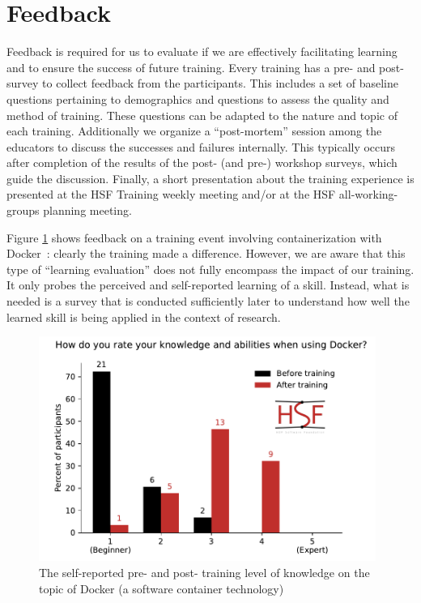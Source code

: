 \documentclass[twocolumn]{svjour3}          %
\begin{document}
\section{Feedback}\label{sec:Feedback}
%
Feedback is required for us to evaluate if we are effectively facilitating learning and to ensure the success of future training. Every training has a pre- and post- survey to collect feedback from the participants. This includes a set of baseline questions pertaining to demographics and questions to assess the quality and method of training. These questions can be adapted to the nature and topic of each training. Additionally we organize a \enquote{post-mortem} session among the educators to discuss the successes and failures internally. This typically occurs after completion of the results of the post- (and pre-) workshop surveys, which guide the discussion. Finally, a short presentation about the training experience is presented at the HSF Training weekly meeting and/or at the HSF all-working-groups planning meeting.

Figure \ref{fig:dockerfeedback} shows feedback on a training event involving containerization with Docker~\cite{HSF-training-Docker-2020}: clearly the training made a difference.  However, we are aware that this type of \enquote{learning evaluation} does not fully encompass the impact of our training. It only probes the perceived and self-reported learning of a skill. Instead, what is needed is a survey that is conducted sufficiently later to understand how well the learned skill is being applied in the context of research.
%
\begin{figure}
\centering
\includegraphics[width=11cm]{dockerfeedback_new.pdf}
\caption{The self-reported  pre- and post- training level of knowledge on the topic of Docker (a software container technology)
\label{fig:dockerfeedback}}
\end{figure}
%
\end{document}
